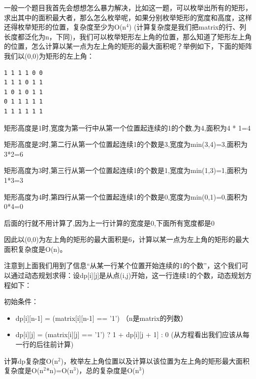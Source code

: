 \documentclass[12pt]{book}
\begin{document}
\begin{enumerate}
一般一个题目我首先会想想怎么暴力解决，比如这一题，可以枚举出所有的矩形，求出其中的面积最大者，那么怎么枚举呢，如果分别枚举矩形的宽度和高度，这样还得枚举矩形的位置，复杂度至少为O(n$^{\text{4}}$) (计算复杂度是我们把matrix的行、列长度都泛化为n，下同)，我们可以枚举矩形左上角的位置，那么知道了矩形左上角的位置，怎么计算以某一点为左上角的矩形的最大面积呢？举例如下，下面的矩阵我们以(0,0)为矩形的左上角：
\lstset{language=java,label= ,caption= ,numbers=none}
\begin{lstlisting}
1 1 1 1 0 0
1 1 1 0 1 1
1 0 1 0 1 1
0 1 1 1 1 1
1 1 1 1 1 1
\end{lstlisting}

矩形高度是1时,宽度为第一行中从第一个位置起连续的1的个数,为4,面积为4 * 1=4

矩形高度是2时,第二行从第一个位置起连续1的个数是3,宽度为min(3,4)=3,面积为3*2=6

矩形高度为3时,第三行从第一个位置起连续1的个数是1,宽度为min(1,3)=1,面积为1*3=3

矩形高度为4时,第四行从第一个位置起连续1的个数是0,宽度为min(0,1)=0,面积为0*4=0

后面的行就不用计算了,因为上一行计算的宽度是0,下面所有宽度都是0

因此以(0,0)为左上角的矩形的最大面积是6，计算以某一点为左上角的矩形的最大面积复杂度是O(n)。

注意到上面我们用到了信息“从某一行某个位置开始连续的1的个数”，这个我们可以通过动态规划求得：设dp[i][j]是从点(i,j)开始，这一行连续1的个数，动态规划方程如下：

初始条件：
\begin{itemize}
\item dp[i][n-1] = (matrix[i][n-1] == '1') （n是matrix的列数）
\item dp[i][j] = (matrix[i][j] == '1') ?  1 + dp[i][j + 1] : 0 (从方程看出我们应该从每一行的后往前计算)
\end{itemize}
计算dp复杂度O(n$^{\text{2}}$)，枚举左上角位置以及计算以该位置为左上角的矩形最大面积复杂度是O(n$^{\text{2}}$*n)=O(n$^{\text{3}}$)，总的复杂度是O(n$^{\text{3}}$)


\end{enumerate}
\end{document}

